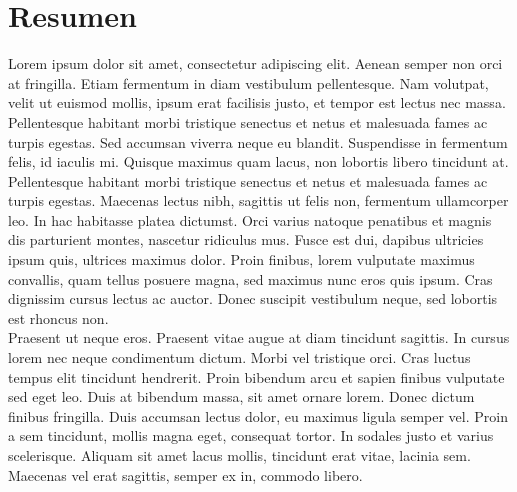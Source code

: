 \chapter*{Resumen}

\thispagestyle{fancy}




Lorem ipsum dolor sit amet, consectetur adipiscing elit. Aenean semper non orci at fringilla. Etiam fermentum in diam vestibulum pellentesque. Nam volutpat, velit ut euismod mollis, ipsum erat facilisis justo, et tempor est lectus nec massa. Pellentesque habitant morbi tristique senectus et netus et malesuada fames ac turpis egestas. Sed accumsan viverra neque eu blandit. Suspendisse in fermentum felis, id iaculis mi. Quisque maximus quam lacus, non lobortis libero tincidunt at. Pellentesque habitant morbi tristique senectus et netus et malesuada fames ac turpis egestas. Maecenas lectus nibh, sagittis ut felis non, fermentum ullamcorper leo. In hac habitasse platea dictumst. Orci varius natoque penatibus et magnis dis parturient montes, nascetur ridiculus mus. Fusce est dui, dapibus ultricies ipsum quis, ultrices maximus dolor. Proin finibus, lorem vulputate maximus convallis, quam tellus posuere magna, sed maximus nunc eros quis ipsum. Cras dignissim cursus lectus ac auctor. Donec suscipit vestibulum neque, sed lobortis est rhoncus non.\\

Praesent ut neque eros. Praesent vitae augue at diam tincidunt sagittis. In cursus lorem nec neque condimentum dictum. Morbi vel tristique orci. Cras luctus tempus elit tincidunt hendrerit. Proin bibendum arcu et sapien finibus vulputate sed eget leo. Duis at bibendum massa, sit amet ornare lorem. Donec dictum finibus fringilla. Duis accumsan lectus dolor, eu maximus ligula semper vel. Proin a sem tincidunt, mollis magna eget, consequat tortor. In sodales justo et varius scelerisque. Aliquam sit amet lacus mollis, tincidunt erat vitae, lacinia sem. Maecenas vel erat sagittis, semper ex in, commodo libero.\\

